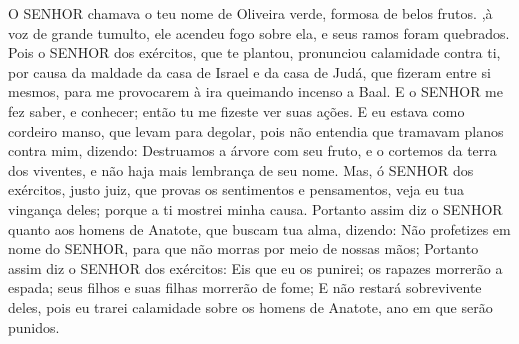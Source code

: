 {{}
O SENHOR chamava o teu nome de Oliveira verde, formosa de belos frutos.
{} ,à voz de grande tumulto, ele acendeu fogo sobre ela, e seus ramos foram quebrados.
Pois o SENHOR dos exércitos, que te plantou, pronunciou calamidade contra ti, por causa da maldade da casa de Israel e da casa de Judá, que fizeram entre si mesmos, para me provocarem à ira queimando
 incenso a Baal.
E o SENHOR me fez saber, e conhecer; então tu me fizeste ver suas ações.
E eu estava como cordeiro manso, que levam para degolar, pois não entendia que tramavam planos contra mim, dizendo: Destruamos a árvore com seu fruto, e o cortemos da terra dos viventes, e não haja mais lembrança de seu nome.
Mas, ó SENHOR dos exércitos, justo juiz, que provas os sentimentos e pensamentos,
 veja eu tua vingança deles; porque a ti mostrei minha causa.
Portanto assim diz o SENHOR quanto aos homens de Anatote, que buscam
{} tua alma, dizendo: Não profetizes em nome do SENHOR, para que não morras por meio de nossas mãos;
Portanto assim diz o SENHOR dos exércitos: Eis que eu os punirei; os rapazes morrerão a espada; seus filhos e suas filhas morrerão de fome;
E não restará sobrevivente deles, pois eu trarei calamidade sobre os homens de Anatote,
{} ano em que serão punidos.

\par }

